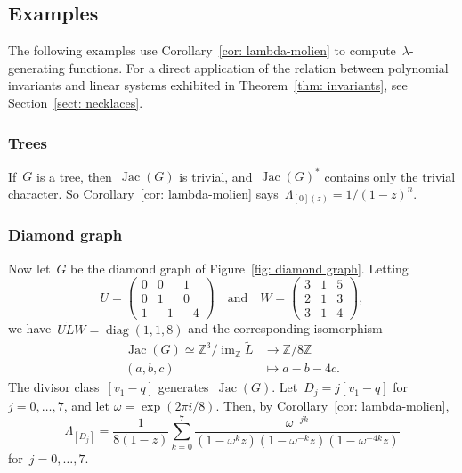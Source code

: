 \documentclass{amsart}
\DeclareMathOperator{\Jac}{Jac}
\DeclareMathOperator{\diag}{diag}
\DeclareMathOperator{\im}{im}
\newcommand{\Z}{\mathbb{Z}}
\newcommand{\tL}{\tilde{L}}
\begin{document}
\subsection{Examples}  The following examples use Corollary~\ref{cor:
lambda-molien} to compute~$\lambda$-generating functions.  For a direct
application of the relation between polynomial invariants and linear systems
exhibited in Theorem~\ref{thm: invariants}, see Section~\ref{sect: necklaces}.
\subsubsection{Trees}  If~$G$ is a tree, then~$\Jac(G)$ is trivial,
and~$\Jac(G)^*$ contains only the trivial character.  So
Corollary~\ref{cor: lambda-molien} says~$\Lambda_{[0](z)}=1/(1-z)^{n}$.

\subsubsection{Diamond graph} Now let~$G$ be the diamond graph of
Figure~\ref{fig: diamond graph}.  Letting
\[
U = 
\left(\begin{array}{rrr}
    0 & 0 & 1 \\
    0 & 1 & 0 \\
    1 & -1 & -4
\end{array}\right)
\quad\text{and}\quad
W = 
\left(\begin{array}{rrr}
    3 & 1 & 5 \\
    2 & 1 & 3 \\
    3 & 1 & 4
\end{array}\right),
\]
we have~$U\tL W =\diag(1,1,8)$ and the corresponding isomorphism
\begin{align*}
  \Jac(G)\simeq\Z^{3}/\im_{\Z}\tL&\to\Z/8\Z\\
  (a,b,c)&\mapsto a-b-4c.
\end{align*}
The divisor class~$[v_1-q]$ generates~$\Jac(G)$. Let~$D_j=j[v_1-q]$
for~$j=0,\dots,7$, and let $\omega=\exp(2\pi i/8)$.  Then, by
Corollary~\ref{cor: lambda-molien}, 
\[
  \Lambda_{[D_j]} =
  \frac{1}{8(1-z)}\sum_{k=0}^7\frac{\omega^{-jk}}{(1-\omega^{k}z)(1-\omega^{-k}z)(1-\omega^{-4k}z)}
\]
for~$j=0,\dots,7$.
\end{document}
